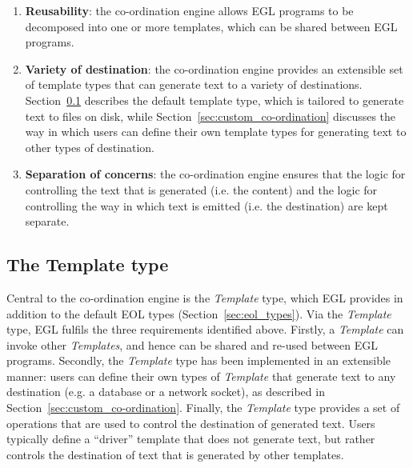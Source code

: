 \begin{enumerate}
	\item \textbf{Reusability}: the co-ordination engine allows EGL programs to be
	                   decomposed into one or more templates, which
	                   can be shared between EGL programs.

	\item \textbf{Variety of destination}: the co-ordination engine provides an
	                              extensible set of template types that can
	                              generate text to a variety of destinations.
	                              Section~\ref{sec:egl_template_type} describes
	                              the default template type, which is 
	                              tailored to generate text to files on disk, 
	                              while Section~\ref{sec:custom_co-ordination} 
	                              discusses the way in  which users can define 
	                              their own template types for generating text to
	                              other types of destination.
	
	\item \textbf{Separation of concerns}: the co-ordination engine ensures that the 
	                              logic for controlling the text that is
	                              generated (i.e. the content) and the logic for
	                              controlling the way in which text is emitted
	                              (i.e. the destination) are kept separate.
\end{enumerate}

\subsection{The Template type}
\label{sec:egl_template_type}
Central to the co-ordination engine is the \emph{Template} type, 
which EGL provides in addition to the default EOL types
(Section~\ref{sec:eol_types}). Via the \emph{Template} type, EGL
fulfils the three requirements identified above. Firstly, a \emph{Template} 
can invoke other \emph{Templates}, and hence can be shared and re-used 
between EGL programs. Secondly, the \emph{Template} type has been implemented
in an extensible manner: users can define their own types of \emph{Template} 
that generate text to any destination (e.g. a database or a network
socket), as described in Section~\ref{sec:custom_co-ordination}. Finally, 
the \emph{Template} type provides a set of operations that are used to 
control the destination of generated text. Users typically define a ``driver''
template that does not generate text, but rather controls the destination 
of text that is generated by other templates. 

